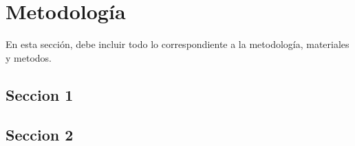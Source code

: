 \chapter{Metodología}

En esta sección, debe incluir todo lo correspondiente a la metodología, materiales y metodos.

\section{Seccion 1}

\section{Seccion 2}